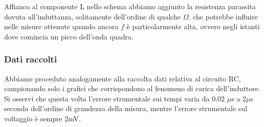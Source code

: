\documentclass[a4paper]{article}
\theoremstyle{definition}
\begin{document}
\noindent Affianco al componente L nello schema abbiamo aggiunto la resistenza parassita dovuta all'induttanza, solitamente dell'ordine di qualche \(\Omega\), che potrebbe influire nelle misure ottenute quando ancora \(f\) è particolarmente alta, ovvero negli istanti dove comincia un picco dell'onda quadra. \\

\subsubsection*{Dati raccolti}
Abbiamo proceduto analogamente alla raccolta dati relativa al circuito RC, campionando solo i grafici che corrispondono al fenomeno di carica dell'induttore. \\
Si osservi che questa volta l'errore strumentale sui tempi varia da 0.02 \(\mu\)s a 2\(\mu\)s seconda dell'ordine di grandezza della misura, mentre l'errore strumentale sul voltaggio è sempre 2mV. 
\end{document}
